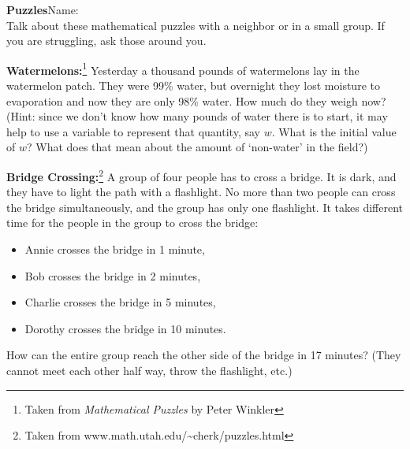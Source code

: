 \documentclass{article}
\begin{document}
{\large\bf Puzzles}\hfill Name: \underline{\hspace{2in}} \\

Talk about these mathematical puzzles with a neighbor or in a small group. If
you are struggling, ask those around you. 

\textbf{Watermelons:}\footnote{Taken from \textit{Mathematical Puzzles} by Peter Winkler} Yesterday a thousand pounds of watermelons lay in the 
watermelon patch. They were 99\% water, but overnight they lost moisture to 
evaporation and now they are only 98\% water. How much do they weigh now?
(Hint: since we don't know how many pounds of water there is to start, it may
help to use a variable to represent that quantity, say $w$. What is the initial
value of $w$? What does that mean about the amount of `non-water' in the field?)

\vfill

\textbf{Bridge Crossing:}\footnote{Taken from
www.math.utah.edu/\textasciitilde cherk/puzzles.html} A group of four people has to cross a bridge. It 
is dark, and they have to light the path with a flashlight. No more than 
two people can cross the bridge simultaneously, and the group has only one 
flashlight. It takes different time for the people in the group to cross 
the bridge: 
\begin{itemize}
\item Annie crosses the bridge in 1 minute,
\item Bob crosses the bridge in 2 minutes,
\item Charlie crosses the bridge in 5 minutes,
\item Dorothy crosses the bridge in 10 minutes. 
\end{itemize}
How can the entire group reach the other side of the bridge in 17 minutes? (They
cannot meet each other half way, throw the flashlight, etc.)

\vfill\newpage
\end{document}
